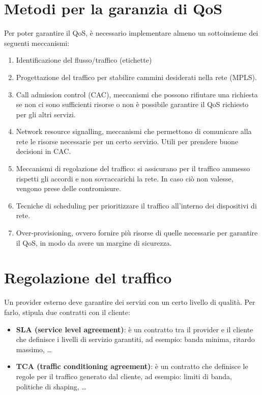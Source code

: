 \section{Metodi per la garanzia di QoS}
Per poter garantire il QoS, è necessario implementare almeno un sottoinsieme dei seguenti meccanismi:
\begin{enumerate}
	\item Identificazione del flusso/traffico (etichette)
	\item Progettazione del traffico per stabilire cammini desiderati nella rete (MPLS).
	\item Call admission control (CAC), meccanismi che possono rifiutare una richiesta se non ci sono sufficienti risorse o non è possibile garantire il QoS richiesto per gli altri servizi.
	\item Network resource signalling, meccanismi che permettono di comunicare alla rete le risorse necessarie per un certo servizio. Utili per prendere buone decisioni in CAC.
	\item Meccanismi di regolazione del traffico: si assicurano per il traffico ammesso rispetti gli accordi e non sovraccarichi la rete.
	In caso ciò non valesse, vengono prese delle contromisure.
	\item Tecniche di scheduling per prioritizzare il traffico all'interno dei dispositivi di rete.
	\item Over-provisioning, ovvero fornire più risorse di quelle necessarie per garantire il QoS, in modo da avere un margine di sicurezza.
\end{enumerate}
\section{Regolazione del traffico}
Un provider esterno deve garantire dei servizi con un certo livello di qualità.
Per farlo, stipula due contratti con il cliente:
\begin{itemize}
	\item \textbf{SLA (service level agreement)}: è un contratto tra il provider e il cliente che definisce i livelli di servizio garantiti, ad esempio: banda minima, ritardo massimo, \ldots
	\item \textbf{TCA (traffic conditioning agreement)}: è un contratto che definisce le regole per il traffico generato dal cliente, ad esempio: limiti di banda, politiche di shaping, \ldots
\end{itemize}
